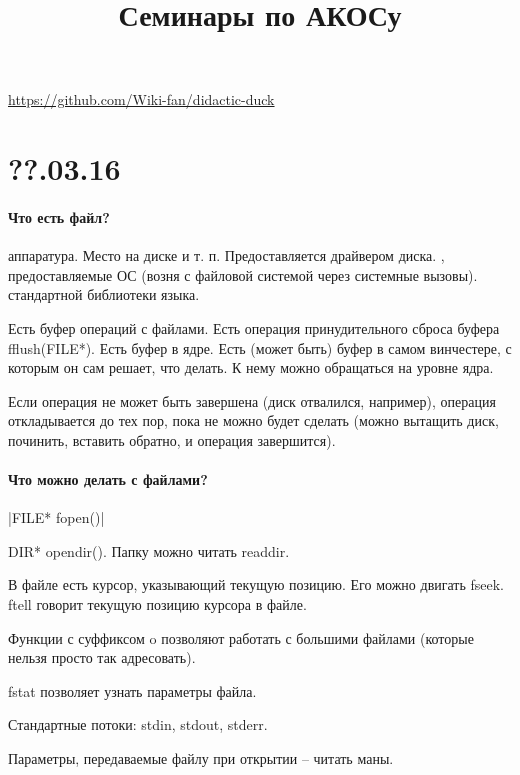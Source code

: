 \documentclass[a4paper,10pt]{article}
\title{\textbf{Семинары по АКОСу}}
\newcommand{\cl}{\mint{c}}
\begin{document}
\maketitle

\begin{center}
 \href{https://github.com/Wiki-fan/didactic-duck}{https://github.com/Wiki-fan/didactic-duck}
\end{center}

\section{??.03.16}

\paragraph{Что есть файл?}

\begin{enumerate}
 аппаратура. Место на диске и т. п. Предоставляется драйвером диска.
, предоставляемые ОС (возня с файловой системой через системные вызовы).
 стандартной библиотеки языка.
\end{enumerate}
Есть буфер операций с файлами. Есть операция принудительного сброса буфера fflush(FILE*). Есть буфер в ядре. Есть (может быть) буфер в самом винчестере, с которым он сам решает, что делать. К нему можно обращаться на уровне ядра.

Если операция не может быть завершена (диск отвалился, например), операция откладывается до тех пор, пока не можно будет сделать (можно вытащить диск, починить, вставить обратно, и операция завершится).


\paragraph{Что можно делать с файлами?}

\cl|FILE* fopen()|

DIR* opendir(). Папку можно читать readdir.

В файле есть курсор, указывающий текущую позицию. Его можно двигать fseek. ftell говорит текущую позицию курсора в файле.

Функции с суффиксом o позволяют работать с большими файлами (которые нельзя просто так адресовать).

fstat позволяет узнать параметры файла.

Стандартные потоки: stdin, stdout, stderr.

Параметры, передаваемые файлу при открытии -- читать маны.
\end{document}
